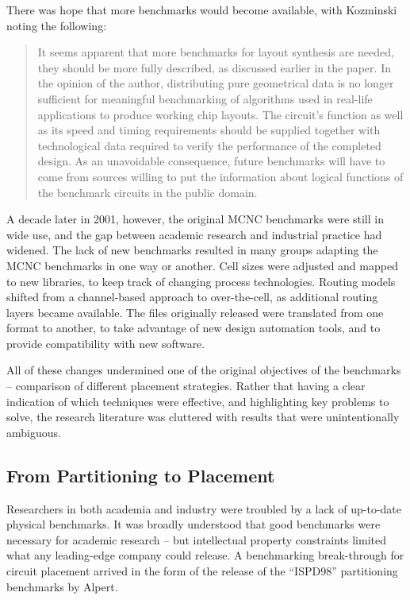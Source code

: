 \documentclass[sigconf]{acmart}
\begin{document}
There was hope that more benchmarks would
become available, with Kozminski\cite{Kozminski91} noting the following:

\begin{quote}
It seems apparent that more benchmarks for layout synthesis are
needed, they should be more fully described, as discussed earlier in
the paper. In the opinion of the author, distributing pure
geometrical data is no longer sufficient for meaningful benchmarking
of algorithms used in real-life applications to produce working chip
layouts. The circuit's function as well as its speed and timing
requirements should be supplied together with technological data
required to verify the performance of the completed design. As an
unavoidable consequence, future benchmarks will have to come from
sources willing to put the information about logical functions of the
benchmark circuits in the public domain.
\end{quote}

A decade later in 2001, however, the original MCNC
benchmarks were still in wide use, and
the gap between academic research and
industrial practice had widened.
The lack of new benchmarks resulted in many groups
adapting the MCNC benchmarks in one way or another.  Cell sizes
were adjusted and mapped to new libraries, to keep
track of changing process technologies.  Routing models
shifted from a channel-based approach to over-the-cell,
as additional routing layers became available.  The
files originally released were translated from one
format to another, to take advantage of new design
automation tools, and to provide compatibility with
new software.

All of these changes undermined one of the original objectives of the
benchmarks -- comparison of different placement strategies.  Rather
that having a clear indication of which techniques were effective, and
highlighting key problems to solve, the research literature was
cluttered with results that were unintentionally
ambiguous\cite{Madden010030}.

\subsection{From Partitioning to Placement}


Researchers in both academia and industry were troubled by a lack of
up-to-date physical benchmarks.  It was broadly understood that good
benchmarks were necessary for academic research -- but intellectual
property constraints limited what any leading-edge company could
release.  A benchmarking break-through for circuit placement arrived
in the form of the release of the ``ISPD98'' partitioning benchmarks by
Alpert\cite{Alpert980080}.
\end{document}

